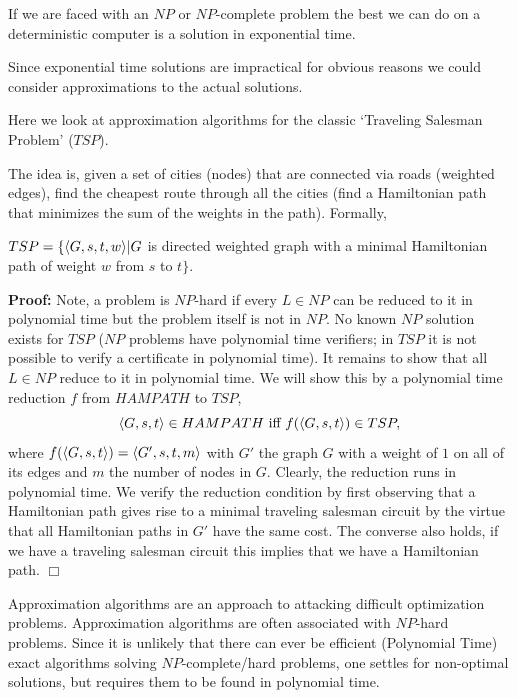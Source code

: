 \documentclass[a4paper,blends,pdf,colorBG,slideColor]{prosper}
\begin{document}
If we are faced with an $NP$ or $NP$-complete problem the best we can do on a
deterministic computer is a solution in exponential time.

Since exponential time solutions are impractical for obvious reasons we could consider approximations
to the actual solutions.

Here we look at approximation algorithms for the classic `Traveling Salesman Problem' ($TSP$).
\es

{\small
The idea is, given a set of cities (nodes) that are connected via roads (weighted edges), find the cheapest route through all the cities (find a Hamiltonian path that minimizes the sum of the weights
in the path).  Formally,

$TSP = \{ \langle {G,s,t,w} \rangle | G$ is directed weighted graph with a minimal Hamiltonian path of
weight $w$ from $s$ to $t \}.$
}
\es


{\small
{}
{\bf Proof:}  Note, a problem is $NP$-hard if every $L \in NP$ can be reduced to it in polynomial time but the problem itself is not in $NP$.  No known $NP$ solution exists for $TSP$ ($NP$ problems have polynomial time verifiers; in $TSP$ it is not possible to verify a certificate in polynomial time).  It remains to show that all $L \in NP$ reduce to it in polynomial time.  We will show this by a polynomial time reduction  $f$ from $HAMPATH$  to $TSP$,
\[
\langle {G,s,t} \rangle \in HAMPATH \mbox{ iff } f(\langle {G,s,t} \rangle) \in TSP,
\]
where $f(\langle {G,s,t} \rangle) = \langle {G',s,t,m} \rangle$ with $G'$ the graph $G$ with a weight of $1$ on all of its edges
and $m$  the number of nodes in $G$.  Clearly, the reduction runs in polynomial time.  We verify the reduction condition by first observing that a Hamiltonian path gives rise to a minimal traveling salesman circuit by the virtue that all Hamiltonian paths in $G'$ have the same cost.  The converse also holds, if we have a traveling salesman circuit this implies that we have a Hamiltonian path. $\Box$
}
\es

Approximation algorithms are an approach to attacking difficult optimization problems. Approximation algorithms are often associated with $NP$-hard problems. Since it is unlikely that there can ever be efficient (Polynomial Time) exact algorithms solving $NP$-complete/hard problems, one settles for non-optimal solutions, but requires them to be found in polynomial time. 
\end{document}
